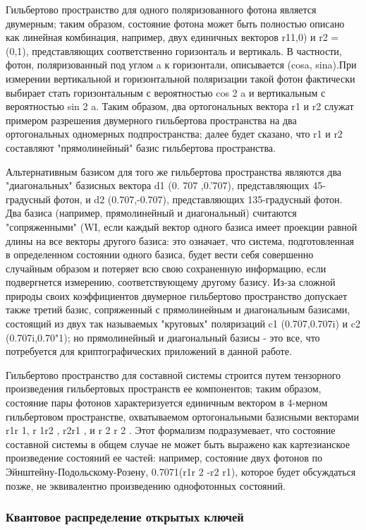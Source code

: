 ­­Гильбертово пространство для одного поляризованного фотона является двумерным; таким образом, состояние фотона может быть полностью описано как линейная комбинация, например, двух единичных векторов r11,0) и r2 = (0,1), представляющих соответственно горизонталь и вертикаль. В частности, фотон, поляризованный под углом a к горизонтали, описывается (cosa, sina).При измерении вертикальной и горизонтальной поляризации такой фотон фактически выбирает стать горизонтальным с вероятностью cos 2 a и вертикальным с вероятностью sin 2 a. Таким образом, два ортогональных вектора r1 и r2 служат примером разрешения двумерного гильбертова пространства на два ортогональных одномерных подпространства; далее будет сказано, что r1 и r2 составляют "прямолинейный" базис гильбертова пространства.

­­Альтернативным базисом для того же гильбертова пространства являются два "диагональных" базисных вектора d1 (0. 707 ,0.'707), представляющих 45-градусный фотон, и d2 (0.707,-0.707), представляющих 135-градусный фотон. Два базиса (например, прямолинейный и диагональный) считаются "сопряженными" (WI, если каждый вектор одного базиса имеет проекции равной длины на все векторы другого базиса: это означает, что система, подготовленная в определенном состоянии одного базиса, будет вести себя совершенно случайным образом и потеряет всю свою сохраненную информацию, если подвергнется измерению, соответствующему другому базису. Из-за сложной природы своих коэффициентов двумерное гильбертово пространство допускает также третий базис, сопряженный с прямолинейным и диагональным базисами, состоящий из двух так называемых "круговых" поляризаций c1 (0.707,0.707i) и c2 (0.707i,0.70"1); но прямолинейный и диагональный базисы - это все, что потребуется для криптографических приложений в данной работе.

­­Гильбертово пространство для составной системы строится путем тензорного произведения гильбертовых пространств ее компонентов; таким образом, состояние пары фотонов характеризуется единичным вектором в 4-мерном гильбертовом пространстве, охватываемом ортогональными базисными векторами r1r 1, r 1r2 , r2r1 , и r 2 r 2 . Этот формализм подразумевает, что состояние составной системы в общем случае не может быть выражено как картезианское произведение состояний ее частей: например, состояние двух фотонов по Эйнштейну-Подольскому-Розену, 0.7071(r1r 2 -r2 r1), которое будет обсуждаться позже, не эквивалентно произведению однофотонных состояний.

\subsubsection{Квантовое распределение открытых ключей}

